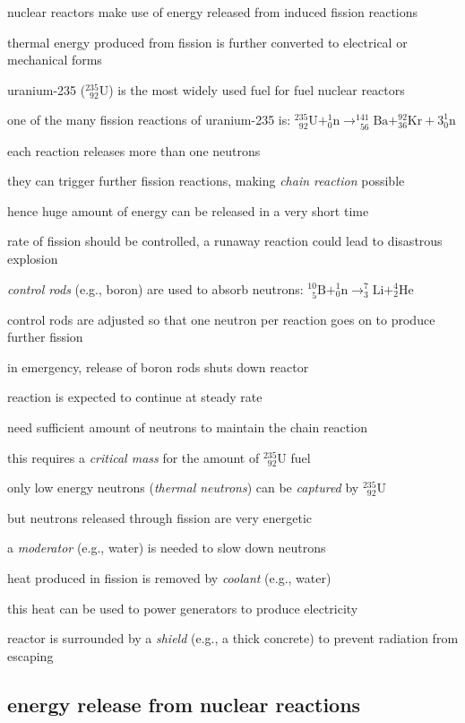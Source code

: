 nuclear reactors make use of energy released from induced fission reactions

thermal energy produced from fission is further converted to electrical or mechanical forms

uranium-235 ($^{235}_{\phantom{1}92}\text{U}$) is the most widely used fuel for fuel nuclear reactors

one of the many fission reactions of uranium-235 is: $^{235}_{\phantom{1}92}\text{U} + ^1_0\text{n} \longrightarrow  ^{141}_{\phantom{1}56}\text{Ba} + ^{92}_{36}\text{Kr} + 3^1_0\text{n}$

\cmt each reaction releases more than one neutrons

they can trigger further fission reactions, making \emph{chain reaction} possible

hence huge amount of energy can be released in a very short time

\cmt rate of fission should be controlled, a runaway reaction could lead to disastrous explosion

\emph{control rods} (e.g., boron) are used to absorb neutrons: $^{10}_{\phantom{1}5}\text{B} + ^1_0\text{n} \longrightarrow  ^{7}_{3}\text{Li} + ^{4}_{2}\text{He}$

control rods are adjusted so that one neutron per reaction goes on to produce further fission

in emergency, release of boron rods shuts down reactor

\cmt reaction is expected to continue at steady rate

need sufficient amount of neutrons to maintain the chain reaction

this requires a \emph{critical mass} for the amount of $^{235}_{\phantom{1}92}\text{U}$ fuel

\cmt only low energy neutrons (\emph{thermal neutrons}) can be \emph{captured} by $^{235}_{\phantom{1}92}\text{U}$

but neutrons released through fission are very energetic

a \emph{moderator} (e.g., water) is needed to slow down neutrons

\cmt heat produced in fission is removed by \emph{coolant} (e.g., water)

this heat can be used to power generators to produce electricity

\cmt reactor is surrounded by a \emph{shield} (e.g., a thick concrete) to prevent radiation from escaping

\subsection{energy release from nuclear reactions}

